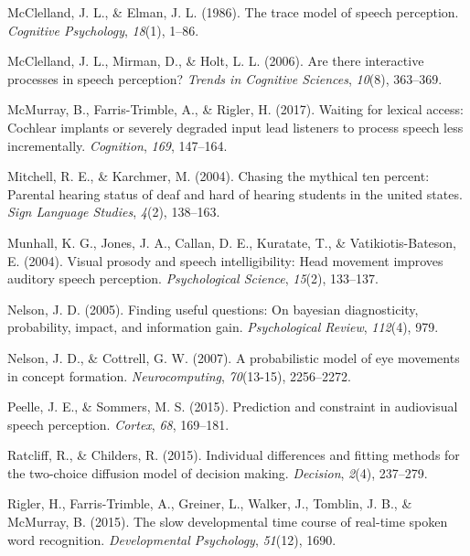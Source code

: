 \documentclass[,man,floatsintext]{apa6}
\begin{document}
\leavevmode\hypertarget{ref-mcclelland1986trace}{}%
McClelland, J. L., \& Elman, J. L. (1986). The trace model of speech perception. \emph{Cognitive Psychology}, \emph{18}(1), 1--86.

\leavevmode\hypertarget{ref-mcclelland2006there}{}%
McClelland, J. L., Mirman, D., \& Holt, L. L. (2006). Are there interactive processes in speech perception? \emph{Trends in Cognitive Sciences}, \emph{10}(8), 363--369.

\leavevmode\hypertarget{ref-mcmurray2017waiting}{}%
McMurray, B., Farris-Trimble, A., \& Rigler, H. (2017). Waiting for lexical access: Cochlear implants or severely degraded input lead listeners to process speech less incrementally. \emph{Cognition}, \emph{169}, 147--164.

\leavevmode\hypertarget{ref-mitchell2004chasing}{}%
Mitchell, R. E., \& Karchmer, M. (2004). Chasing the mythical ten percent: Parental hearing status of deaf and hard of hearing students in the united states. \emph{Sign Language Studies}, \emph{4}(2), 138--163.

\leavevmode\hypertarget{ref-munhall2004visual}{}%
Munhall, K. G., Jones, J. A., Callan, D. E., Kuratate, T., \& Vatikiotis-Bateson, E. (2004). Visual prosody and speech intelligibility: Head movement improves auditory speech perception. \emph{Psychological Science}, \emph{15}(2), 133--137.

\leavevmode\hypertarget{ref-nelson2005finding}{}%
Nelson, J. D. (2005). Finding useful questions: On bayesian diagnosticity, probability, impact, and information gain. \emph{Psychological Review}, \emph{112}(4), 979.

\leavevmode\hypertarget{ref-nelson2007probabilistic}{}%
Nelson, J. D., \& Cottrell, G. W. (2007). A probabilistic model of eye movements in concept formation. \emph{Neurocomputing}, \emph{70}(13-15), 2256--2272.

\leavevmode\hypertarget{ref-peelle2015prediction}{}%
Peelle, J. E., \& Sommers, M. S. (2015). Prediction and constraint in audiovisual speech perception. \emph{Cortex}, \emph{68}, 169--181.

\leavevmode\hypertarget{ref-ratcliff2015individual}{}%
Ratcliff, R., \& Childers, R. (2015). Individual differences and fitting methods for the two-choice diffusion model of decision making. \emph{Decision}, \emph{2}(4), 237--279.

\leavevmode\hypertarget{ref-rigler2015slow}{}%
Rigler, H., Farris-Trimble, A., Greiner, L., Walker, J., Tomblin, J. B., \& McMurray, B. (2015). The slow developmental time course of real-time spoken word recognition. \emph{Developmental Psychology}, \emph{51}(12), 1690.
\end{document}
